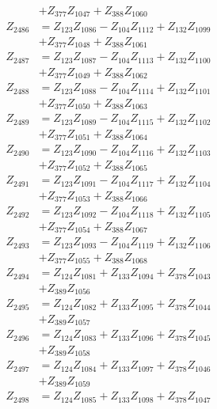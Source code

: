 \begin{multicols}{2}
\begin{align}
&+ Z_{377}Z_{1047} + Z_{388}Z_{1060} \nonumber \\
Z_{2486} &= Z_{123}Z_{1086} - Z_{104}Z_{1112} + Z_{132}Z_{1099}  \nonumber \\
&+ Z_{377}Z_{1048} + Z_{388}Z_{1061} \nonumber \\
Z_{2487} &= Z_{123}Z_{1087} - Z_{104}Z_{1113} + Z_{132}Z_{1100}  \nonumber \\
&+ Z_{377}Z_{1049} + Z_{388}Z_{1062} \nonumber \\
Z_{2488} &= Z_{123}Z_{1088} - Z_{104}Z_{1114} + Z_{132}Z_{1101}  \nonumber \\
&+ Z_{377}Z_{1050} + Z_{388}Z_{1063} \nonumber \\
Z_{2489} &= Z_{123}Z_{1089} - Z_{104}Z_{1115} + Z_{132}Z_{1102}  \nonumber \\
&+ Z_{377}Z_{1051} + Z_{388}Z_{1064} \nonumber \\
Z_{2490} &= Z_{123}Z_{1090} - Z_{104}Z_{1116} + Z_{132}Z_{1103}  \nonumber \\
&+ Z_{377}Z_{1052} + Z_{388}Z_{1065} \nonumber \\
Z_{2491} &= Z_{123}Z_{1091} - Z_{104}Z_{1117} + Z_{132}Z_{1104}  \nonumber \\
&+ Z_{377}Z_{1053} + Z_{388}Z_{1066} \nonumber \\
Z_{2492} &= Z_{123}Z_{1092} - Z_{104}Z_{1118} + Z_{132}Z_{1105}  \nonumber \\
&+ Z_{377}Z_{1054} + Z_{388}Z_{1067} \nonumber \\
Z_{2493} &= Z_{123}Z_{1093} - Z_{104}Z_{1119} + Z_{132}Z_{1106}  \nonumber \\
&+ Z_{377}Z_{1055} + Z_{388}Z_{1068} \nonumber \\
Z_{2494} &= Z_{124}Z_{1081} + Z_{133}Z_{1094} + Z_{378}Z_{1043}  \nonumber \\
&+ Z_{389}Z_{1056} \nonumber \\
Z_{2495} &= Z_{124}Z_{1082} + Z_{133}Z_{1095} + Z_{378}Z_{1044}  \nonumber \\
&+ Z_{389}Z_{1057} \nonumber \\
Z_{2496} &= Z_{124}Z_{1083} + Z_{133}Z_{1096} + Z_{378}Z_{1045}  \nonumber \\
&+ Z_{389}Z_{1058} \nonumber \\
Z_{2497} &= Z_{124}Z_{1084} + Z_{133}Z_{1097} + Z_{378}Z_{1046}  \nonumber \\
&+ Z_{389}Z_{1059} \nonumber \\
Z_{2498} &= Z_{124}Z_{1085} + Z_{133}Z_{1098} + Z_{378}Z_{1047}  \nonumber \\

\end{align}
\end{multicols}
